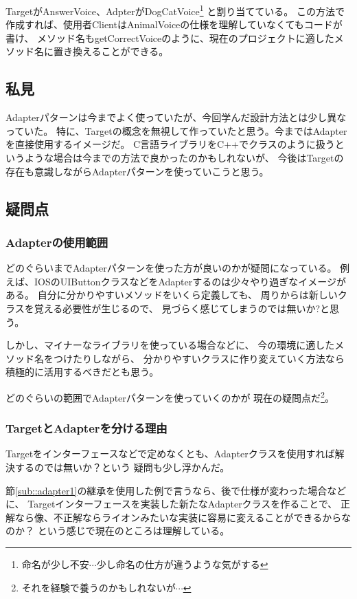 \documentclass[11pt]{jsarticle}
\begin{document}
			TargetがAnswerVoice、AdpterがDogCatVoice\footnote{命名が少し不安$\cdots$少し命名の仕方が違うような気がする}
			と割り当てている。
			この方法で作成すれば、使用者ClientはAnimalVoiceの仕様を理解していなくてもコードが書け、
			メソッド名もgetCorrectVoiceのように、現在のプロジェクトに適したメソッド名に置き換えることができる。
		
		\subsection{私見}
			Adapterパターンは今までよく使っていたが、今回学んだ設計方法とは少し異なっていた。
			特に、Targetの概念を無視して作っていたと思う。今まではAdapterを直接使用するイメージだ。
			C言語ライブラリをC++でクラスのように扱うというような場合は今までの方法で良かったのかもしれないが、
			今後はTargetの存在も意識しながらAdapterパターンを使っていこうと思う。
			
		\color{red}
		\subsection{疑問点}
			\subsubsection{Adapterの使用範囲}
				どのぐらいまでAdapterパターンを使った方が良いのかが疑問になっている。
				例えば、IOSのUIButtonクラスなどをAdapterするのは少々やり過ぎなイメージがある。
				自分に分かりやすいメソッドをいくら定義しても、
				周りからは新しいクラスを覚える必要性が生じるので、
				見づらく感じてしまうのでは無いか?と思う。
				
				しかし、マイナーなライブラリを使っている場合などに、
				今の環境に適したメソッド名をつけたりしながら、
				分かりやすいクラスに作り変えていく方法なら積極的に活用するべきだとも思う。
				
				どのぐらいの範囲でAdapterパターンを使っていくのかが
				現在の疑問点だ\footnote{それを経験で養うのかもしれないが$\cdots$}。
			\subsubsection{TargetとAdapterを分ける理由}
				Targetをインターフェースなどで定めなくとも、Adapterクラスを使用すれば解決するのでは無いか？という
				疑問も少し浮かんだ。
				
				節\ref{sub::adapter1}の継承を使用した例で言うなら、後で仕様が変わった場合などに、
				Targetインターフェースを実装した新たなAdapterクラスを作ることで、
				正解なら像、不正解ならライオンみたいな実装に容易に変えることができるからなのか？
				という感じで現在のところは理解している。
		\color{black}
		
\end{document}

